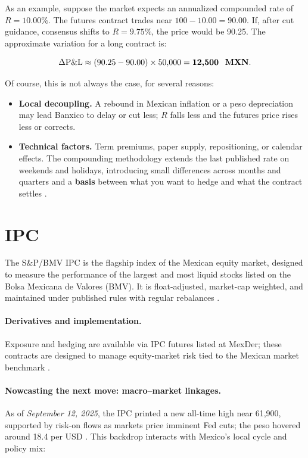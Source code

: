 \documentclass[10pt,a4paper]{article} %
\let\oldsection\section
\renewcommand{\section}{%
      \clearpage
      \thispagestyle{myfancy}%
      \oldsection
    }
\begin{document}
As an example, suppose the market expects an annualized compounded rate of $R = 10.00\%$. The futures contract trades near $100 - 10.00 = 90.00$. If, after cut guidance, consensus shifts to $R = 9.75\%$, the price would be 90.25. The approximate variation for a long contract is:

\[
\Delta \text{P\&L} \approx (90.25 - 90.00)\times 50{,}000 = \textbf{12{,}500 \ \text{MXN}}.
\]

Of course, this is not always the case, for several reasons:

\begin{itemize}
    \item \textbf{Local decoupling.} A rebound in Mexican inflation or a peso depreciation may lead Banxico to delay or cut less; $R$ falls less and the futures price rises less or corrects.
    \item \textbf{Technical factors.} Term premiums, paper supply, repositioning, or calendar effects. The compounding methodology extends the last published rate on weekends and holidays, introducing small differences across months and quarters and a \textbf{basis} between what you want to hedge and what the contract settles \citep{cme2025a,cme2025b}.
\end{itemize}



\section{IPC}

The S\&P/BMV IPC is the flagship index of the Mexican equity market, designed to measure the performance of the largest and most liquid stocks listed on the Bolsa Mexicana de Valores (BMV). It is float-adjusted, market-cap weighted, and maintained under published rules with regular rebalances \citep{spdj_ipc_page,spdj_bmv_methodology}.

\paragraph{Derivatives and implementation.}
Exposure and hedging are available via IPC futures listed at MexDer; these contracts are designed to manage equity-market risk tied to the Mexican market benchmark \citep{mexder_ipc_fut}.

\paragraph{Nowcasting the next move: macro–market linkages.}
As of \emph{September 12, 2025}, the IPC printed a new all-time high near 61{,}900, supported by risk-on flows as markets price imminent Fed cuts; the peso hovered around 18.4 per USD \citep{reuters_ipc_record_2025,reuters_usdmxn_quote}. This backdrop interacts with Mexico’s local cycle and policy mix:
\end{document}
